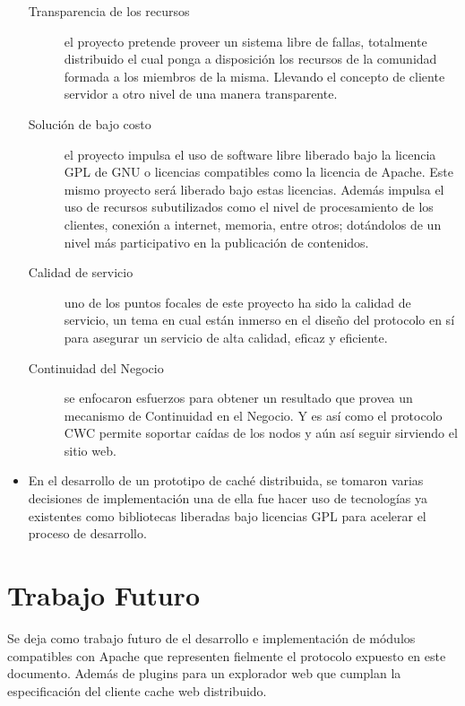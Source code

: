 \begin{itemize}
	\begin{description}
	\item[Transparencia de los recursos] el proyecto pretende proveer un sistema libre de fallas, totalmente distribuido el cual ponga a disposición los recursos de la comunidad formada a los miembros de la misma. Llevando el concepto de cliente servidor a otro nivel de una manera transparente. 
	
	\item [Solución de bajo costo] el proyecto impulsa el uso de software libre liberado bajo la licencia GPL de GNU o licencias compatibles como la licencia de Apache. Este mismo proyecto será liberado bajo estas licencias. Además impulsa el uso de recursos subutilizados como el nivel de procesamiento de los clientes, conexión a internet, memoria, entre otros; dotándolos de un nivel más participativo en la publicación de contenidos.
	
	\item [Calidad de servicio] uno de los puntos focales de este proyecto ha sido la calidad de servicio, un tema en cual están inmerso en el diseño del protocolo en sí para asegurar un servicio de alta calidad, eficaz y eficiente. 
	
	\item [Continuidad del Negocio] se enfocaron esfuerzos para obtener un resultado que provea un mecanismo de Continuidad en el Negocio. Y es así como el protocolo CWC permite soportar caídas de los nodos y aún así seguir sirviendo el sitio web.
	\end{description}

\item En el desarrollo de un prototipo de caché distribuida, se tomaron varias decisiones de implementación una de ella fue hacer uso de tecnologías ya existentes como bibliotecas liberadas bajo licencias GPL para acelerar el proceso de desarrollo. 
\end{itemize}


\section{Trabajo Futuro}

Se deja como trabajo futuro de el desarrollo e implementación de módulos compatibles con Apache que representen fielmente el protocolo expuesto en este documento. Además de plugins para un explorador web que cumplan la especificación del cliente cache web distribuido.

